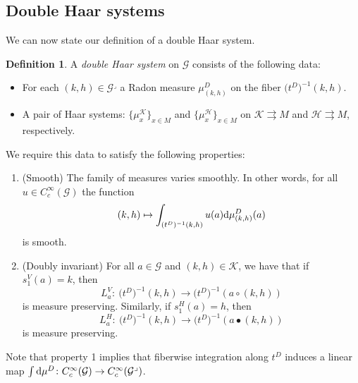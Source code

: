 \documentclass[10pt,a4paper]{amsart}
\numberwithin{equation}{section}
\theoremstyle{definition}
\newtheorem{Definition}[Theorem]{Definition}
\newcommand{\CG}{\mathcal{G}}
\newcommand{\CH}{\mathcal{H}}
\newcommand{\CK}{\mathcal{K}}
\newcommand{\inv}{^{-1}}
\newcommand{\grpd}{\rightrightarrows}
\begin{document}
\subsection{Double Haar systems}
We can now state our definition of a double Haar system.

\begin{Definition}\label{defn:double.haar.system}
A \emph{double Haar system} on $ \CG $ consists of the following data:
\begin{itemize}\itemsep=0pt
  \item For each $ (k,h) \in \CG^\lrcorner $ a Radon measure $ \mu_{(k,h)}^D $ on the fiber $ \big(t^D\big)\inv(k,h) $.
  \item A pair of Haar systems: $ \big\{\mu_x^\CK\big\}_{x \in M} $ and $\big\{\mu_x^\CH\big\}_{x \in M } $ on $ \CK \grpd M $ and $ \CH \grpd M $, respectively.
\end{itemize}
We require this data to satisfy the following properties:
\begin{enumerate}\itemsep=0pt
  \item[(1)] (Smooth) The family of measures varies smoothly. In other words, for all $ u \in C^\infty_c(\CG) $ the function
  \[ (k,h) \mapsto \int_{(t^D)\inv(k,h)} u(a) {\rm d} \mu_{(k,h)}^D (a)\]
  is smooth.
  \item[(2)] (Doubly invariant) For all $ a \in \CG$ and $ (k,h) \in \CK $, we have that if $ s^V_1(a) = k $, then
  \[ L^V_a \colon\ \big(t^D\big)\inv(k,h) \to \big(t^D\big)\inv(a \circ (k,h))\]
  is measure preserving. Similarly, if $ s^H_1(a) = h $, then
    \[ L^H_a \colon\ \big(t^D\big)\inv(k,h) \to \big(t^D\big)\inv(a \bullet (k,h))\]
    is measure preserving.
\end{enumerate}
\end{Definition}
Note that property 1 implies that fiberwise integration along $ t^D $ induces a linear map
$\int {\rm d} \mu^D \colon\allowbreak C^\infty_c(\CG) \to C^\infty_c(\CG^\lrcorner)$.
\end{document}
